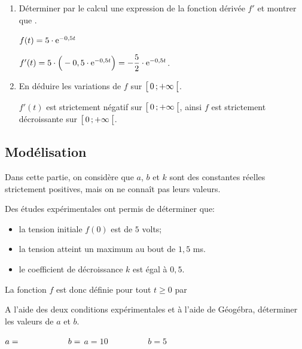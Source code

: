 \begin{enumerate}[series=monDS, resume]
    \item Déterminer par le calcul une expression de la fonction dérivée $f'$ et montrer que .
    \begin{blocvisiblex}[height=2.8]
    {\quad}
    $f(t)= 5 \cdot \mathrm{e}^{-0,5t}$

    $f'(t)= 5 \cdot \Big(-0,5\cdot \mathrm{e}^{-0,5t}\Big)=-\dfrac{5}{2}\cdot \mathrm{e}^{-0,5t}$.
    \end{blocvisiblex}
    \medskip
    \item En déduire les variations de $f$ sur $\bigl[ \, 0 \, ; +\infty \,\bigl[$.
    \begin{blocvisiblex}[height=3]
    {\quad}
    $f'(t)$ est strictement négatif sur $\bigl[ \, 0 \, ; +\infty \,\bigl[$, ainsi $f$ est strictement décroissante sur $\bigl[ \, 0 \, ; +\infty \,\bigl[$.
    \end{blocvisiblex}

\end{enumerate}


\subsection*{Modélisation}

Dans cette partie, on considère que $a$, $b$ et $k$ sont des constantes réelles strictement positives, mais on ne connaît pas leurs valeurs.

Des études expérimentales ont permis de déterminer que:
\begin{itemize}
    \item la tension initiale $f(0)$ est de $5$ volts;
    \item la tension atteint un maximum au bout de $1,5$ ms.
    \item le coefficient de décroissance $k$ est égal à $0,5$.
\end{itemize}

La fonction $f$ est donc définie pour tout $t\geqslant 0$ par 

\bigskip

\begin{enumerate}[series=monDS, resume]
    \begin{minipage}{0.48\textwidth}
    \item A l'aide des deux conditions expérimentales et à l'aide de Géogébra, déterminer les valeurs de $a$ et $b$.
\end{minipage}\hfill{}
\begin{minipage}{0.45\textwidth}
    \begin{blocvisiblex}[height=1.2]
    {$a=\dotfill \hspace{2cm} b=\dotfill$}
    $a=10 \hspace{2cm} b=5$
    \end{blocvisiblex}
\end{minipage}
    \appelprof{}
\end{enumerate}


